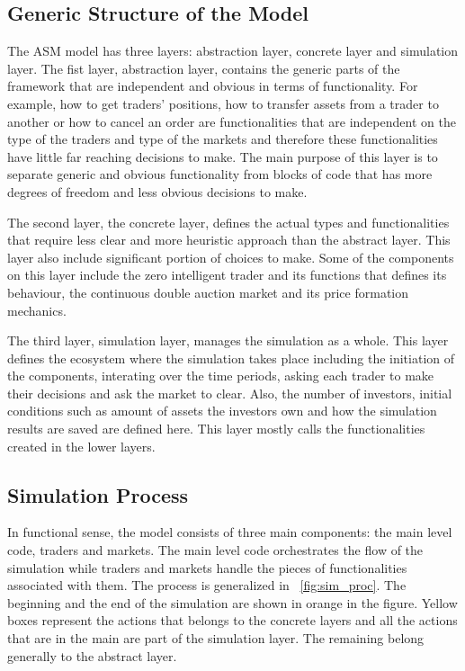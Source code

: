 \subsection{Generic Structure of the Model}
The ASM model has three layers: abstraction layer, concrete 
layer and simulation layer. The fist layer, abstraction layer, contains the 
generic parts of the framework that are independent and obvious in terms
of functionality. For example, how to get traders' positions, how to
transfer assets from a trader to another or how to cancel an order are
functionalities that are independent on the type of the traders 
and type of the markets and therefore these functionalities have little
far reaching decisions to make. The main purpose of this layer
is to separate generic and obvious functionality from blocks of code
that has more degrees of freedom and less obvious decisions to make.

The second layer, the concrete layer, defines the actual types and
functionalities that require less clear and more heuristic
approach than the abstract layer. This layer also include significant
portion of choices to make. Some of the components
on this layer include the zero intelligent trader and its
functions that defines its behaviour, the continuous double auction
market and its price formation mechanics.

The third layer, simulation layer, manages the simulation as a whole.
This layer defines the ecosystem where the simulation takes place including
the initiation of the components, interating over the time periods, asking
each trader to make their decisions and ask the market to clear. 
Also, the number of investors, initial conditions such as amount of assets 
the investors own and how the simulation results are saved are defined here. 
This layer mostly calls the functionalities created in the lower layers.



\subsection{Simulation Process}
In functional sense, the model consists of three main components:
the main level code, traders and markets. The main level code 
orchestrates the flow of the simulation while traders and markets
handle the pieces of functionalities associated with them. The process
is generalized in ~\ref{fig:sim_proc}. The beginning and the end of the 
simulation are shown in orange in the figure. Yellow boxes represent
the actions that belongs to the concrete layers and all the actions that
are in the main are part of the simulation layer. The remaining belong
generally to the abstract layer.


